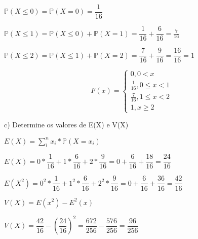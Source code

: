 \documentclass[12pt,a4paper]{article}
\begin{document}
\begin{center}
\vspace{0.25cm}
$\mathbb{P}(X\leq{0}) = \mathbb{P}(X=0) = \dfrac{1}{16}$

\vspace{0.5cm}
$\mathbb{P}(X\leq1) = \mathbb{P}(X\leq{0}) + \mathbb{P}(X=1) = \dfrac{1}{16} + \dfrac{6}{16} = \frac{7}{16}$

\vspace{0.5cm}
$\mathbb{P}(X\leq{2}) = \mathbb{P}(X\leq1) + \mathbb{P}(X=2) = \dfrac{7}{16} + \dfrac{9}{16} = \dfrac{16}{16} = 1$

\[
F(x) =
\begin{cases}
0, 0 < x \\
\frac{1}{16}, 0\leq{x} < 1 \\
\frac{7}{16}, 1\leq{x} < 2\\
1,x\geq{2}
\end{cases}
\]

\vspace{1cm}

\end{center}

\vspace{1cm}
c) Determine os valores de E(X) e V(X)

\begin{center}
\vspace{0.25cm}
$E(X) = \sum_{i}^{n} x_{i}*\mathbb{P}(X = x_{i})$

\vspace{1cm}
$E(X) = 0*\dfrac{1}{16}+1*\dfrac{6}{16}+2*\dfrac{9}{16} = 0 + \dfrac{6}{16} + \dfrac{18}{16} = \dfrac{24}{16}$

\vspace{1cm}
$E(X^{2}) = 0^{2}*\dfrac{1}{16}+1^{2}*\dfrac{6}{16}+2^{2}*\dfrac{9}{16} = 0 + \dfrac{6}{16} + \dfrac{36}{16} = \dfrac{42}{16}$

\vspace{1cm}
$V(X) = E(x^{2}) - E^{2}(x)$

\vspace{1cm}
$V(X) = \dfrac{42}{16}-(\dfrac{24}{16})^{2} = \dfrac{672}{256}-\dfrac{576}{256}=\dfrac{96}{256}$
\end{center}
\end{document}
